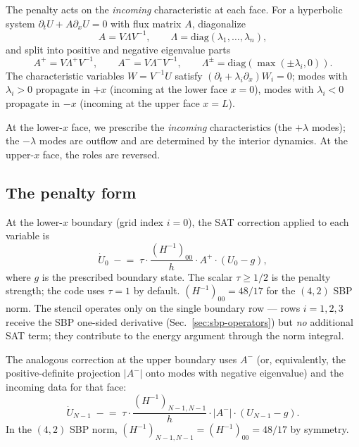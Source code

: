\documentclass[11pt]{article}
\begin{document}
The penalty acts on the \emph{incoming} characteristic at each face.
For a hyperbolic system $\partial_t U + A \partial_x U = 0$ with
flux matrix $A$, diagonalize
\begin{equation}
  A = V \Lambda V^{-1}, \qquad \Lambda = \mathrm{diag}(\lambda_1, \ldots, \lambda_n),
\end{equation}
and split into positive and negative eigenvalue parts
\begin{equation}
  A^+ = V \Lambda^+ V^{-1}, \qquad A^- = V \Lambda^- V^{-1},
  \qquad \Lambda^\pm = \mathrm{diag}(\max(\pm \lambda_i, 0)).
\end{equation}
The characteristic variables $W = V^{-1} U$ satisfy $(\partial_t + \lambda_i \partial_x) W_i = 0$;
modes with $\lambda_i > 0$ propagate in $+x$ (incoming at the lower face $x = 0$), modes with
$\lambda_i < 0$ propagate in $-x$ (incoming at the upper face $x = L$).

At the lower-$x$ face, we prescribe the \emph{incoming} characteristics
(the $+\lambda$ modes); the $-\lambda$ modes are outflow and are
determined by the interior dynamics. At the upper-$x$ face, the roles
are reversed.

\subsection{The penalty form}

At the lower-$x$ boundary (grid index $i = 0$), the SAT correction
applied to each variable is
\begin{equation}
  \dot U_0 \;\mathrel{-}=\; \tau \cdot \frac{(H^{-1})_{00}}{h} \cdot A^+ \cdot (U_0 - g),
  \label{eq:sat-lower}
\end{equation}
where $g$ is the prescribed boundary state. The scalar $\tau \geq 1/2$
is the penalty strength; the code uses $\tau = 1$ by default.
$(H^{-1})_{00} = 48/17$ for the $(4,2)$ SBP norm. The stencil operates
only on the single boundary row — rows $i = 1, 2, 3$ receive the SBP
one-sided derivative (Sec.~\ref{sec:sbp-operators}) but \emph{no}
additional SAT term; they contribute to the energy argument through
the norm integral.

The analogous correction at the upper boundary uses $A^-$ (or,
equivalently, the positive-definite projection $|A^-|$ onto modes
with negative eigenvalue) and the incoming data for that face:
\begin{equation}
  \dot U_{N-1} \;\mathrel{-}=\; \tau \cdot \frac{(H^{-1})_{N-1,N-1}}{h}
  \cdot |A^-| \cdot (U_{N-1} - g).
  \label{eq:sat-upper}
\end{equation}
In the $(4,2)$ SBP norm, $(H^{-1})_{N-1,N-1} = (H^{-1})_{00} = 48/17$
by symmetry.
\end{document}
